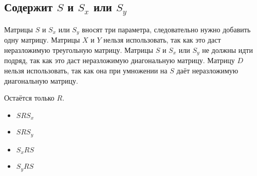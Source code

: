 \subsection{Содержит $S$ и $S_x$ или $S_y$}

Матрицы $S$ и $S_x$ или $S_y$ вносят три параметра, следовательно нужно добавить одну матрицу.
Матрицы $X$ и $Y$ нельзя использовать, так как это даст неразложимую треугольную матрицу.
Матрицы $S$ и $S_x$ или $S_y$ не должны идти подряд, так как это даст неразложимую диагональную матрицу.
Матрицу $D$ нельзя использовать, так как она при умножении на $S$ даёт неразложимую диагональную матрицу.

Остаётся только $R$.

\begin{itemize}
	\item $S R S_x$
	\item $S R S_y$
	\item $S_x R S$
	\item $S_y R S$
\end{itemize}